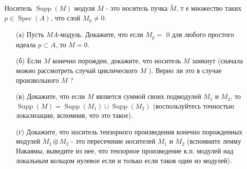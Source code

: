 \begin{prob}
Носитель $\operatorname{Supp}(M)$ модуля $M$ - это носитель пучка $\tilde{M}$, т е множество таких $p \in \operatorname{Spec}(A)$, что слой $M_p \neq 0$.
\begin{itemize}
\item[]
\item[(а)] Пусть $M A$-модуль. Докажите, что если $M_p=$ 0 для любого простого идеала $p \subset A$, то $M=0$.
\item[(б)] Если $M$ конечно порожден, докажите, что носитель $M$ замкнут (сначала можно рассмотреть случай циклического $M$ ). Верно ли это в случае произвольного $M$ ?
\item[(в)] Докажите, что если $M$ является суммой своих подмодулей $M_1$ и $M_2$, то $\operatorname{Supp}(M)=\operatorname{Supp}\left(M_1\right) \cup \operatorname{Supp}\left(M_2\right)$ (воспользуйтесь точностью локализации, вспомнив, что это такое).
\item[(г)] Докажите, что носитель тензорного произведения конечно порожденных модулей $M_1 \otimes M_2$ - это пересечение носителей $M_1$ и $M_2$ (вспомните лемму Накаямы, выведите из нее, что тензорное произведение к.п. модулей над локальным кольцом нулевое если и только если таков один из модулей).
\end{itemize}
\end{prob}
